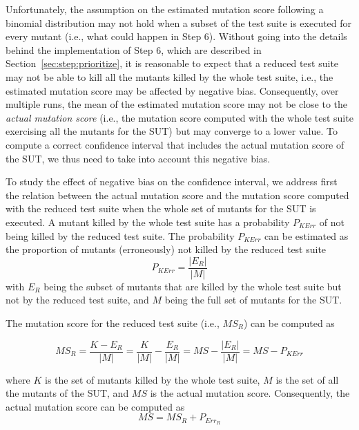  {Unfortunately, the assumption on the estimated mutation score following a binomial distribution may not hold when a subset of the test suite is executed for every mutant (i.e., what could happen in Step 6). Without going into the details behind the implementation of Step 6, which are described in Section~\ref{sec:step:prioritize}, 
it is reasonable to expect that a reduced test suite may not be able to kill all the mutants killed by the whole test suite, i.e., the estimated mutation score may be affected by negative bias. Consequently, over multiple runs, the mean of the estimated mutation score may not be close to the \emph{actual mutation score} (i.e., the mutation score computed with the whole test suite exercising all the mutants for the SUT)
 but may converge to a lower value. 
To compute a correct confidence interval that includes the actual mutation score of the SUT, we thus need to take into account this negative bias.}

 {To study the effect of negative bias on the confidence interval, we address first the relation between the actual mutation score and the mutation score computed with the reduced test suite when the whole set of mutants for the SUT is executed. 
A mutant killed by the whole test suite has a probability $P_{\mathit{KErr}}$ of not being killed by the reduced test suite.
The probability $P_{\mathit{KErr}}$  can be estimated as the proportion of mutants (erroneously) not killed by the reduced test suite 
\begin{equation}
P_{\mathit{KErr}} = \frac{|E_R|}{|M|}
\end{equation}
with 
$E_R$ being the subset of mutants that are killed by the whole test suite but not by the reduced test suite, and $M$ being the full set of mutants for the SUT.}

The mutation score for the reduced test suite (i.e., $\mathit{MS}_R$) can be computed as

\begin{equation}
\mathit{MS}_R=\frac{K-E_R}{|M|}=\frac{K}{|M|}-\frac{E_R}{|M|}=\mathit{MS}-\frac{|E_R|}{|M|}=\mathit{MS}-P_{\mathit{KErr}}
\end{equation}

where $K$ is the set of mutants killed by the whole test suite, $M$ is the set of all the mutants of the SUT,  and $\mathit{MS}$ is the actual mutation score. Consequently, the actual mutation score can be computed as 
\begin{equation}
\label{eq:MS}
\mathit{MS}=\mathit{MS}_R+P_{\mathit{Err}_R}
\end{equation}

